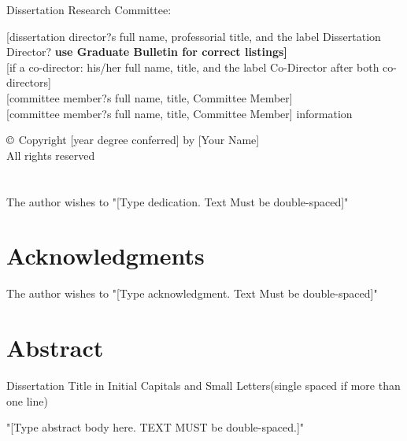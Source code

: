 \documentclass[letterpaper,12pt]{article}
\begin{document}
\noindent Dissertation Research Committee:\\
\hfill\begin{minipage}{5in}
{[dissertation director?s full name, professorial title, and the label Dissertation
Director? \bf use Graduate Bulletin for correct listings]}\\
{[if a co-director: his/her full name, title, and the label Co-Director after both
co-directors]}\\
{[committee member?s full name, title, Committee Member]}\\
{[committee member?s full name, title, Committee Member]} %
information
\end{minipage}
\newpage
{}
\vspace*{\fill}
\begin{center}
\singlespacing
$\copyright$ Copyright [year degree conferred] by [Your Name]\\ All rights reserved
\end{center}
\vspace*{\fill}
\newpage
\section{\protect{}}
The author wishes to "[Type dedication. Text Must be double-spaced]"
\doublespacing
\newpage
\section{\protect \centering Acknowledgments}
The author wishes to "[Type acknowledgment. Text Must be double-spaced]"
\doublespacing
\newpage
\section{\protect \centering Abstract}
\begin{center}
\singlespacing
{\normalsize Dissertation Title in Initial Capitals and Small Letters(single spaced
if more than one line)}
\end{center}
"[Type abstract body here. TEXT MUST be double-spaced.]"
\doublespacing
\newpage
{}
\tableofcontents
\restoregeometry
\newpage
\cleardoublepage
{} \label{listoffig}
\begin{center}
\listoffigures
\end{center}
\newpage
\cleardoublepage
{} \label{listoftab}
\normalsize
\begin{center}
\listoftables
\end{center}
\newpage
\cleardoublepage
\end{document}
